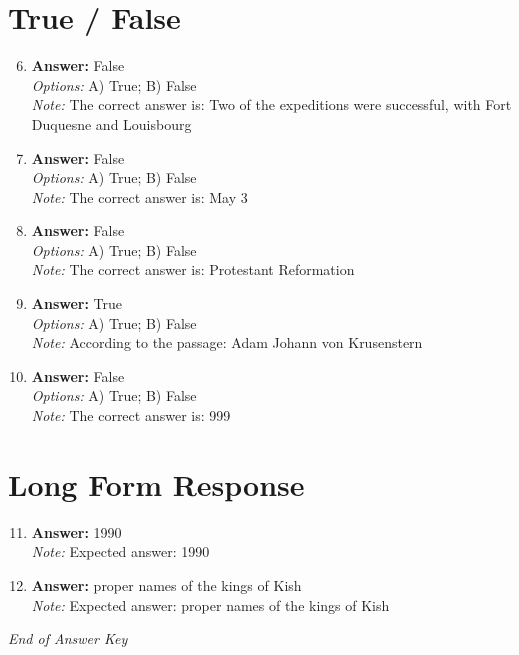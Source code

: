 \documentclass[12pt]{article}
\begin{document}
\section*{True / False}
\begin{enumerate}[label=\arabic*.]
\setcounter{enumi}{5}
\item \textbf{Answer:} False
\\ \textit{Options:} A) True; B) False
\\ \textit{Note:} The correct answer is: Two of the expeditions were successful, with Fort Duquesne and Louisbourg
\item \textbf{Answer:} False
\\ \textit{Options:} A) True; B) False
\\ \textit{Note:} The correct answer is: May 3
\item \textbf{Answer:} False
\\ \textit{Options:} A) True; B) False
\\ \textit{Note:} The correct answer is: Protestant Reformation
\item \textbf{Answer:} True
\\ \textit{Options:} A) True; B) False
\\ \textit{Note:} According to the passage: Adam Johann von Krusenstern
\item \textbf{Answer:} False
\\ \textit{Options:} A) True; B) False
\\ \textit{Note:} The correct answer is: 999
\end{enumerate}

\section*{Long Form Response}
\begin{enumerate}[label=\arabic*.]
\setcounter{enumi}{10}
\item \textbf{Answer:} 1990
\\ \textit{Note:} Expected answer: 1990
\item \textbf{Answer:} proper names of the kings of Kish
\\ \textit{Note:} Expected answer: proper names of the kings of Kish
\end{enumerate}

\vfill
\noindent\textit{End of Answer Key}
\end{document}
